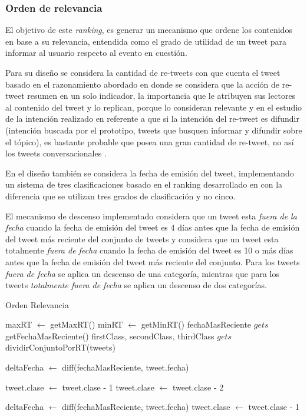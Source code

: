 \subsubsection{Orden de relevancia}\label{subsubsec:orden-rel} 	

El objetivo de este \emph{ranking}, es generar un mecanismo que ordene los contenidos en base a su relevancia, entendida como el grado de utilidad de un tweet para informar al usuario respecto al evento en cuestión.

Para su diseño se considera la cantidad de re-tweets con que cuenta el tweet basado en el razonamiento abordado en \cite{conf/cikm/UysalC11} donde se considera que la acción de re-tweet resumen en un solo indicador, la importancia que le atribuyen sus lectores al contenido del tweet y lo replican, porque lo consideran relevante y en el estudio de la intención realizado en \cite{Yamaguchi:2010:TTU:1991336.1991364} referente a que si la intención del re-tweet es difundir (intención buscada por el prototipo, tweets que busquen informar y difundir sobre el tópico), es bastante probable que posea una gran cantidad de re-tweet, no así los tweets conversacionales .
 
 En el diseño también se considera la fecha de emisión del tweet, implementando un sistema de tres clasificaciones basado en el ranking desarrollado en \cite{Dong:2010:TEI:1772690.1772725} con la diferencia que se utilizan tres grados de clasificación y no cinco.

El mecanismo de descenso implementado considera que un tweet esta \emph{fuera de la fecha} cuando la fecha de emisión del tweet es 4 días antes que la fecha de emisión del tweet más reciente del conjunto de tweets y considera que un tweet esta totalmente \emph{fuera de fecha} cuando la fecha de emisión del tweet es 10 o más días antes que la fecha de emisión del tweet más reciente del conjunto. Para los tweets \emph{fuera de fecha} se aplica un descenso de una categoría, mientras que para los tweets \emph{totalmente fuera de fecha} se aplica un descenso de dos categorías.

\begin{algorithm}[H]
	\caption{Orden Relevancia}\label{OrdenRel}
	\begin{algorithmic}[1]
		\State maxRT $\gets$ getMaxRT()
		\State minRT $\gets$ getMinRT()
		\State fechaMasReciente $gets$ getFechaMasReciente()
		\State firstClass, secondClass, thirdClass $gets$ dividirConjuntoPorRT(tweets)
		
		\State deltaFecha $\gets$ diff(fechaMasReciente, tweet.fecha)
		
			\State tweet.clase $\gets$ tweet.clase - 1
				\State tweet.clase $\gets$ tweet.clase - 2
		\EndIf
		
		\EndFor
		
		\State deltaFecha $\gets$ diff(fechaMasReciente, tweet.fecha)
				\State tweet.clase $\gets$ tweet.clase - 1
			\EndIf
		\EndFor	
		\EndFunction
	\end{algorithmic}
\end{algorithm}

